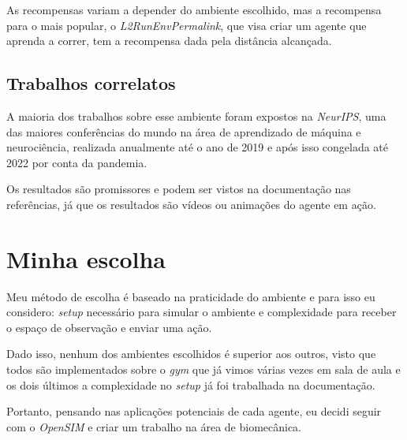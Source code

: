 \documentclass[12pt]{article}
\begin{document}
As recompensas variam a depender do ambiente escolhido, mas a recompensa para o mais popular, o \textit{L2RunEnvPermalink}, que visa criar um agente que aprenda a correr, tem a recompensa dada pela distância alcançada.

\subsection{Trabalhos correlatos}

A maioria dos trabalhos sobre esse ambiente foram expostos na \textit{NeurIPS}, uma das maiores conferências do mundo na área de aprendizado de máquina e neurociência, realizada anualmente até o ano de 2019 e após isso congelada até 2022 por conta da pandemia.

Os resultados são promissores e podem ser vistos na documentação nas referências, já que os resultados são vídeos ou animações do agente em ação.

\section{Minha escolha}

Meu método de escolha é baseado na praticidade do ambiente e para isso eu considero: \textit{setup} necessário para simular o ambiente e complexidade para receber o espaço de observação e enviar uma ação.

Dado isso, nenhum dos ambientes escolhidos é superior aos outros, visto que todos são implementados sobre o \textit{gym} que já vimos várias vezes em sala de aula e os dois últimos a complexidade no \textit{setup} já foi trabalhada na documentação.

Portanto, pensando nas aplicações potenciais de cada agente, eu decidi seguir com o \textit{OpenSIM} e criar um trabalho na área de biomecânica.

\pagebreak
\printbibliography
\pagebreak
\end{document}
